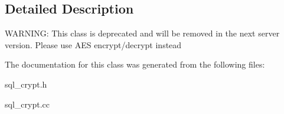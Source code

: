 \subsection{Detailed Description}
W\+A\+R\+N\+I\+NG\+: This class is deprecated and will be removed in the next server version. Please use A\+ES encrypt/decrypt instead 

The documentation for this class was generated from the following files\+:\begin{DoxyCompactItemize}
\item 
sql\+\_\+crypt.\+h\item 
sql\+\_\+crypt.\+cc\end{DoxyCompactItemize}
